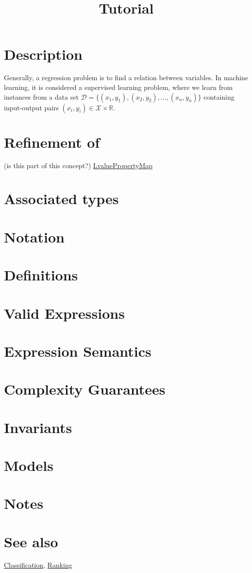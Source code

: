 \documentclass{article}
\begin{document}
\title{Tutorial}
\maketitle

\section*{Description}

Generally, a regression problem is to find a relation between variables. 
In machine learning, it is considered a supervised learning problem, where we 
learn from instances from a data set 
$\mathcal{D}=\{ (x_1,y_1), (x_2,y_2), \ldots, (x_n, y_n ) \}$ 
containing input-output pairs $(x_i,y_i)\in \mathcal{X}\times \mathbb{R}$. 

\begin{figure}
\end{figure}


\section*{Refinement of}

(is this part of this concept?)
\href{http://www.boost.org/libs/property_map/LvaluePropertyMap.html}{LvaluePropertyMap}

\section*{Associated types}
\section*{Notation}
\section*{Definitions}
\section*{Valid Expressions}
\section*{Expression Semantics}
\section*{Complexity Guarantees}
\section*{Invariants}
\section*{Models}
\section*{Notes}
\section*{See also}

\href{\kmlroot/classification.html}{Classification},
\href{\kmlroot/ranking.html}{Ranking}



\end{document}
